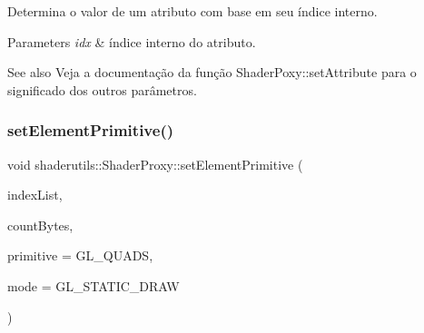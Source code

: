 Determina o valor de um atributo com base em seu índice interno. 
\begin{DoxyParams}{Parameters}
{\em idx} & índice interno do atributo. \\
\hline
\end{DoxyParams}
\begin{DoxySeeAlso}{See also}
Veja a documentação da função Shader\+Poxy\+::set\+Attribute para o significado dos outros parâmetros. 
\end{DoxySeeAlso}
\mbox{\label{classshaderutils_1_1_shader_proxy_aa64c5b908d59fd145686f9e85eccca9f}} 
\subsubsection{\texorpdfstring{set\+Element\+Primitive()}{setElementPrimitive()}}
{\footnotesize\ttfamily void shaderutils\+::\+Shader\+Proxy\+::set\+Element\+Primitive (\begin{DoxyParamCaption}\item[{G\+Luint $\ast$}]{index\+List,  }\item[{G\+Luint}]{count\+Bytes,  }\item[{G\+Lenum}]{primitive = {\ttfamily GL\+\_\+QUADS},  }\item[{G\+Lenum}]{mode = {\ttfamily GL\+\_\+STATIC\+\_\+DRAW} }\end{DoxyParamCaption})\hspace{0.3cm}{\ttfamily [inline]}}

